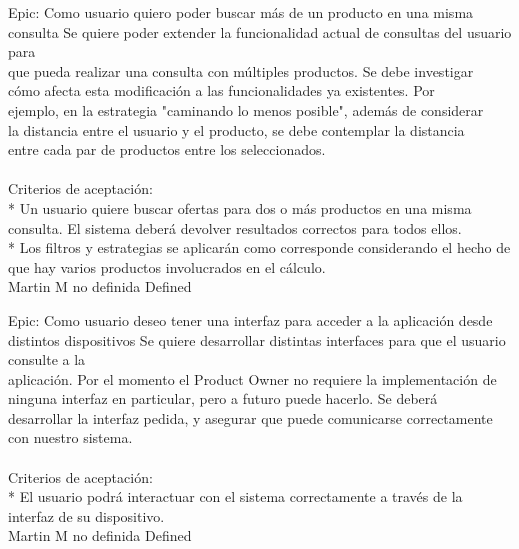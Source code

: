 \vspace{20pt}

	{Epic: Como usuario quiero poder buscar más de un producto en una misma consulta} %
	{Se quiere poder extender la funcionalidad actual de consultas del usuario para\\
que pueda realizar una consulta con múltiples productos. Se debe investigar\\
cómo afecta esta modificación a las funcionalidades ya existentes. Por\\
ejemplo, en la estrategia "caminando lo menos posible", además de considerar\\
la distancia entre el usuario y el producto, se debe contemplar la distancia\\
entre cada par de productos entre los seleccionados.\\
  \\
Criterios de aceptación:\\
* Un usuario quiere buscar ofertas para dos o más productos en una misma consulta. El sistema deberá devolver resultados correctos para todos ellos.  \\
* Los filtros y estrategias se aplicarán como corresponde considerando el hecho de que hay varios productos involucrados en el cálculo.\\
} %
	{} %
	{} %
	{Martin M} %
	{no definida} %
	{Defined} %


\vspace{20pt}

	{Epic: Como usuario deseo tener una interfaz para acceder a la aplicación desde distintos dispositivos} %
	{Se quiere desarrollar distintas interfaces para que el usuario consulte a la\\
aplicación. Por el momento el Product Owner no requiere la implementación de\\
ninguna interfaz en particular, pero a futuro puede hacerlo. Se deberá\\
desarrollar la interfaz pedida, y asegurar que puede comunicarse correctamente\\
con nuestro sistema.\\
  \\
Criterios de aceptación:\\
* El usuario podrá interactuar con el sistema correctamente a través de la interfaz de su dispositivo.\\
} %
	{} %
	{} %
	{Martin M} %
	{no definida} %
	{Defined} %


\vspace{20pt}

